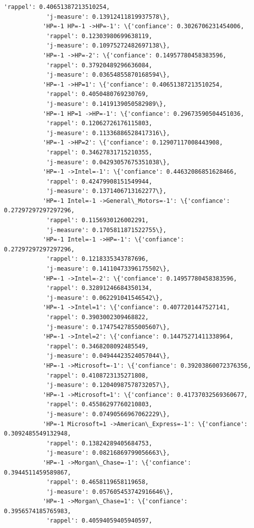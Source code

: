 \documentclass[11pt]{article}
\begin{document}
\begin{Verbatim}[commandchars=\\\{\}]
            'rappel': 0.40651387213510254,
            'j-measure': 0.13912411819937578\},
           'HP=-1 HP=-1 ->HP=-1': \{'confiance': 0.3026706231454006,
            'rappel': 0.12303980699638119,
            'j-measure': 0.10975272482697138\},
           'HP=-1 ->HP=-2': \{'confiance': 0.14957780458383596,
            'rappel': 0.37920489296636084,
            'j-measure': 0.03654855870168594\},
           'HP=-1 ->HP=1': \{'confiance': 0.40651387213510254,
            'rappel': 0.4050480769230769,
            'j-measure': 0.1419139050582989\},
           'HP=-1 HP=1 ->HP=-1': \{'confiance': 0.29673590504451036,
            'rappel': 0.12062726176115803,
            'j-measure': 0.11336886528417316\},
           'HP=-1 ->HP=2': \{'confiance': 0.12907117008443908,
            'rappel': 0.34627831715210355,
            'j-measure': 0.04293057675351038\},
           'HP=-1 ->Intel=-1': \{'confiance': 0.44632086851628466,
            'rappel': 0.42479908151549944,
            'j-measure': 0.1371406713162277\},
           'HP=-1 Intel=-1 ->General\_Motors=-1': \{'confiance': 0.27297297297297296,
            'rappel': 0.1156930126002291,
            'j-measure': 0.1705811871522755\},
           'HP=-1 Intel=-1 ->HP=-1': \{'confiance': 0.27297297297297296,
            'rappel': 0.1218335343787696,
            'j-measure': 0.14110473396175502\},
           'HP=-1 ->Intel=-2': \{'confiance': 0.14957780458383596,
            'rappel': 0.32891246684350134,
            'j-measure': 0.062291041546542\},
           'HP=-1 ->Intel=1': \{'confiance': 0.4077201447527141,
            'rappel': 0.3903002309468822,
            'j-measure': 0.17475427855005607\},
           'HP=-1 ->Intel=2': \{'confiance': 0.14475271411338964,
            'rappel': 0.3468208092485549,
            'j-measure': 0.04944423524057044\},
           'HP=-1 ->Microsoft=-1': \{'confiance': 0.39203860072376356,
            'rappel': 0.4108723135271808,
            'j-measure': 0.12040987578732057\},
           'HP=-1 ->Microsoft=1': \{'confiance': 0.41737032569360677,
            'rappel': 0.45586297760210803,
            'j-measure': 0.07490566967062229\},
           'HP=-1 Microsoft=1 ->American\_Express=-1': \{'confiance': 0.3092485549132948,
            'rappel': 0.13824289405684753,
            'j-measure': 0.08216869799056663\},
           'HP=-1 ->Morgan\_Chase=-1': \{'confiance': 0.3944511459589867,
            'rappel': 0.4658119658119658,
            'j-measure': 0.057605453742916646\},
           'HP=-1 ->Morgan\_Chase=1': \{'confiance': 0.3956574185765983,
            'rappel': 0.40594059405940597,

\end{Verbatim}
\end{document}

